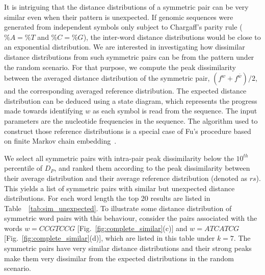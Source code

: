 \documentclass[review,12pt]{elsarticle}
\begin{document}
It is intriguing that the distance distributions
of a symmetric pair can be very similar even
when their pattern is unexpected.
If genomic sequences were generated from
independent symbols only subject to
Chargaff's
parity rule ($\%A =\%T$ and $\%C =\%G$),
the inter-word distance distributions would be
close to an exponential distribution.
We are interested in investigating how dissimilar distance
distributions from such symmetric pairs
can be from the pattern under the random
scenario.
For that purpose, we compute the peak
dissimilarity between the averaged distance
distribution of the symmetric pair,
$(f^w+f^{\bar{w}})/2$, and the corresponding
averaged reference distribution.
The expected distance distribution can be deduced
using a state diagram, which represents the
progress made towards identifying $w$ as
each symbol is read from the sequence.
The input parameters are the nucleotide
frequencies in the sequence.
The algorithm used to construct those
reference distributions is a special case of
Fu's procedure based on finite Markov chain
embedding~\cite{fu1996}.

We select all symmetric pairs with
intra-pair peak dissimilarity below the
$10^{th}$ percentile of $D_P$, and ranked them
according to the peak dissimilarity between
their average distribution and their average reference
distribution (denoted as $rs$). This yields a list of symmetric
pairs with similar but unexpected distance
distributions. For each word length the top 20
results are listed in
Table~~\ref{tab:sim_unexpected}.
To illustrate some distance distribution of symmetric word pairs
with this behaviour, consider the pairs associated with
the words $w=CCGTCCG$
[Fig.~\ref{fig:complete_similar}(c)]
and $w=ATCATCG$ [Fig.~\ref{fig:complete_similar}(d)], which are
listed in this table under $k=7$.
The symmetric pairs have very similar distance distributions and their strong peaks make
them very dissimilar from the expected distributions in the random scenario.
\end{document}
